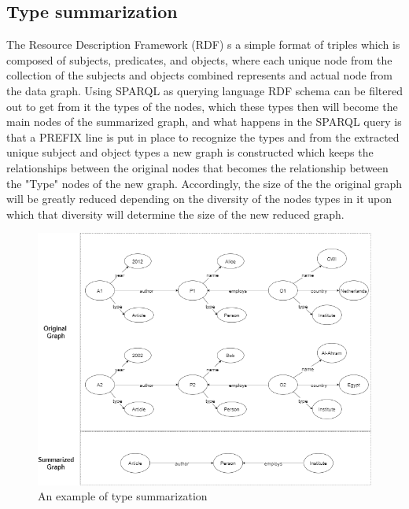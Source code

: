 \documentclass[11pt]{article}
\begin{document}
\subsection{Type summarization}
The Resource Description Framework (RDF) s a simple format of triples which is composed of subjects, predicates, and objects, where each unique node from the collection of the subjects and objects combined represents and actual node from the data graph. Using SPARQL as querying language RDF schema can be filtered out to get from it the types of the nodes, which these types then will become the main nodes of the summarized graph, and what happens in the SPARQL query is that a PREFIX line is put in place to recognize the types and from the extracted unique subject and object types a new graph is constructed which keeps the relationships between the original nodes that becomes the relationship between the "Type" nodes of the new graph. Accordingly, the size of the the original graph will be greatly reduced depending on the diversity of the nodes types in it upon which that diversity will determine the size of the new reduced graph.

\begin{figure}[H]
    \centering
    \includegraphics[width=0.8\linewidth, frame]{new_diag.png}
    \caption{\small An example of type summarization}
    \label{fig:type_summary}
\end{figure}
\end{document}
